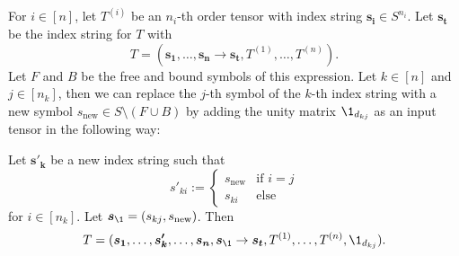 \begin{lemma}
    For $i \in [n]$, let $T^{(i)}$ be an $n_i$-th order tensor with index string $\bm{s_i} \in S^{n_i}$.
    Let $\bm{s_t}$ be the index string for $T$ with
    $$T = (\bm{s_1}, \dots, \bm{s_n} \rightarrow \bm{s_t}, T^{(1)}, \dots, T^{(n)}).$$
    Let $F$ and $B$ be the free and bound symbols of this expression.
    Let $k \in [n]$ and $j \in [n_k]$, then we can replace the $j$-th symbol of the $k$-th index string with a new symbol $s_{\text{new}} \in S \setminus (F \cup B)$ by adding the unity matrix $\1_{d_{kj}}$ as an input tensor in the following way:

    Let $\bm{s'_k}$ be a new index string such that
    $$s'_{ki} := \begin{cases}
            s_{\text{new}} & \text{if $i = j$} \\
            s_{ki}         & \text{else}
        \end{cases}$$
    for $i \in [n_k]$.
    Let $\bm{s_\1} = (s_{kj}, s_{\text{new}})$.
    Then
    $$T = (\bm{s_1}, \dots, \bm{s'_k}, \dots, \bm{s_n}, \bm{s_\1} \rightarrow \bm{s_t}, T^{(1)}, \dots, T^{(n)}, \1_{d_{kj}}).$$
\end{lemma}


